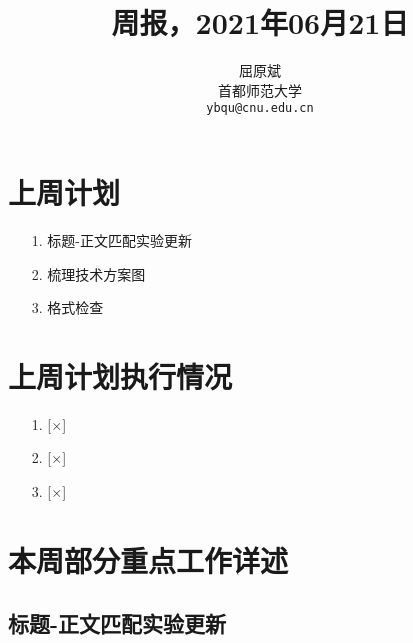 \documentclass[11pt]{article}
\title{周报，2021年06月21日}
\author{屈原斌 \\
  首都师范大学 \\
    {\tt ybqu@cnu.edu.cn}}
\date{}
\begin{document}
\begin{CJK}{UTF8}{gkai}

\maketitle
\CJKindent

\section{上周计划}


\begin{itemize}
  \item [1.] 标题-正文匹配实验更新
  \item [2.] 梳理技术方案图
  \item [3.] 格式检查
\end{itemize}


\section{上周计划执行情况}
\begin{itemize}
\item [1.] [$\times$] 
\item [2.] [$\times$] 
\item [3.] [$\times$] 
\end{itemize}

\section{本周部分重点工作详述}

\subsection{标题-正文匹配实验更新}


\end{CJK}
\end{document}
